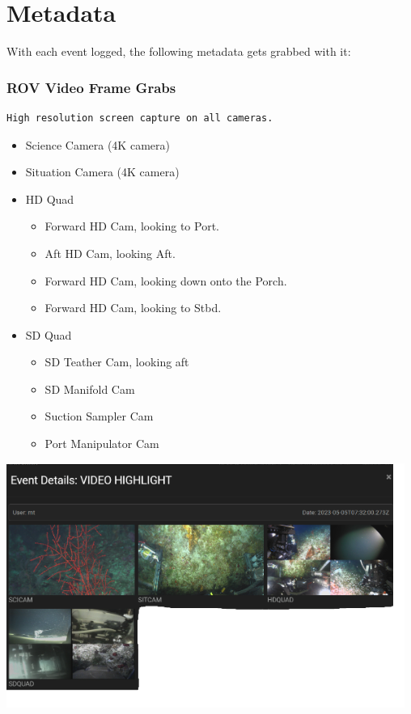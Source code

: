 \documentclass[
  letterpaper,
  DIV=11,
  numbers=noendperiod]{scrreprt}
\providecommand{\tightlist}{%
  \setlength{\itemsep}{0pt}\setlength{\parskip}{0pt}}\usepackage{longtable,booktabs,array}
\begin{document}
\hypertarget{metadata}{%
\section{Metadata}\label{metadata}}

With each event logged, the following metadata gets grabbed with it:

\hypertarget{rov-video-frame-grabs}{%
\subsubsection{ROV Video Frame Grabs}\label{rov-video-frame-grabs}}

\begin{verbatim}
High resolution screen capture on all cameras.
\end{verbatim}

\begin{itemize}
\tightlist
\item
  Science Camera (4K camera)
\item
  Situation Camera (4K camera)
\item
  HD Quad

  \begin{itemize}
  \tightlist
  \item
    Forward HD Cam, looking to Port.
  \item
    Aft HD Cam, looking Aft.
  \item
    Forward HD Cam, looking down onto the Porch.
  \item
    Forward HD Cam, looking to Stbd.
  \end{itemize}
\item
  SD Quad

  \begin{itemize}
  \tightlist
  \item
    SD Teather Cam, looking aft
  \item
    SD Manifold Cam
  \item
    Suction Sampler Cam
  \item
    Port Manipulator Cam
  \end{itemize}
\end{itemize}

\includegraphics{images/eventdetails.png}
\end{document}
